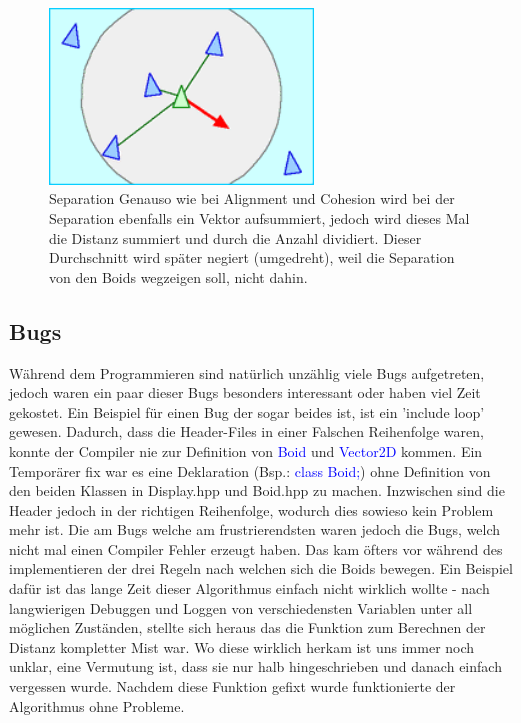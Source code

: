 \documentclass{article}
\begin{document}
            \begin{figure}
                \centering
                \includegraphics[width=7cm]{images/separation.png}
                \caption{Separation Genauso wie bei Alignment und Cohesion wird bei der Separation ebenfalls ein Vektor aufsummiert, jedoch wird dieses Mal die Distanz summiert und durch die Anzahl dividiert. Dieser Durchschnitt wird später negiert (umgedreht), weil die Separation von den Boids wegzeigen soll, nicht dahin.}
            \end{figure}
        \pagebreak
        
        \subsection{Bugs}
            Während dem Programmieren sind natürlich unzählig viele Bugs aufgetreten, jedoch waren ein paar dieser Bugs besonders interessant oder haben viel Zeit gekostet.
            Ein Beispiel für einen Bug der sogar beides ist, ist ein 'include loop' gewesen. Dadurch, dass die Header-Files in einer Falschen Reihenfolge waren, konnte der Compiler nie zur Definition von \textcolor{blue}{Boid} und \textcolor{blue}{Vector2D} kommen. Ein Temporärer fix war es eine Deklaration (Bsp.: \textcolor{blue}{class Boid;}) ohne Definition von den beiden Klassen in Display.hpp und Boid.hpp zu machen. Inzwischen sind die Header jedoch in der richtigen Reihenfolge, wodurch dies sowieso kein Problem mehr ist. 
            Die am Bugs welche am frustrierendsten waren jedoch die Bugs, welch nicht mal einen Compiler Fehler erzeugt haben. Das kam öfters vor während des implementieren der drei Regeln nach welchen sich die Boids bewegen. Ein Beispiel dafür ist das lange Zeit dieser Algorithmus einfach nicht wirklich wollte - nach langwierigen Debuggen und Loggen von verschiedensten Variablen unter all möglichen Zuständen, stellte sich heraus das die Funktion zum Berechnen der Distanz kompletter Mist war. Wo diese wirklich herkam ist uns immer noch unklar, eine Vermutung ist, dass sie nur halb hingeschrieben und danach einfach vergessen wurde. Nachdem diese Funktion gefixt wurde funktionierte der Algorithmus ohne Probleme.
        
\end{document}
